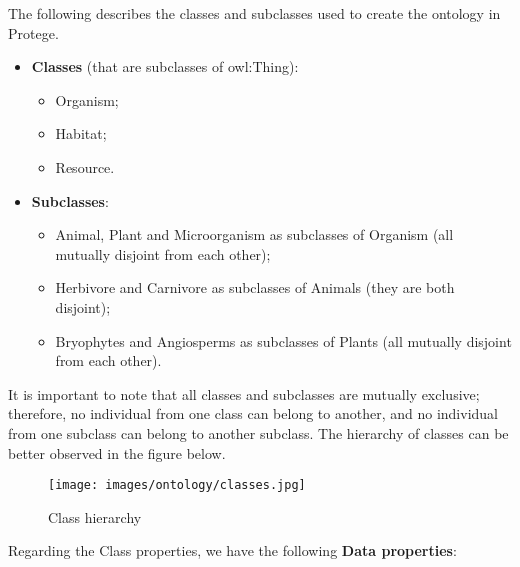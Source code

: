 
The following describes the classes and subclasses used to create the ontology in Protege.
\\

\begin{itemize}
    \item \textbf{Classes} (that are subclasses of owl:Thing):
    \begin{itemize}
        \item Organism;

        \item Habitat;

        \item Resource.
        \\
    \end{itemize}

    \item \textbf{Subclasses}:
    \begin{itemize}
        \item Animal, Plant and Microorganism as subclasses of Organism (all mutually disjoint from each other);

        \item Herbivore and Carnivore as subclasses of Animals (they are both disjoint);

        \item Bryophytes and  Angiosperms as subclasses of Plants (all mutually disjoint from each other).
        \\
    \end{itemize} 
\end{itemize}

It is important to note that all classes and subclasses are mutually exclusive; therefore, no individual from one class can belong to another, and no individual from one subclass can belong to another subclass. The hierarchy of classes can be better observed in the figure below.

\begin{figure}[H]
    \centering
    \texttt{[image: images/ontology/classes.jpg]}
    \caption{Class hierarchy}
    \label{fig:diagram}
\end{figure}


Regarding the Class properties, we have the following \textbf{Data properties}:
\\

